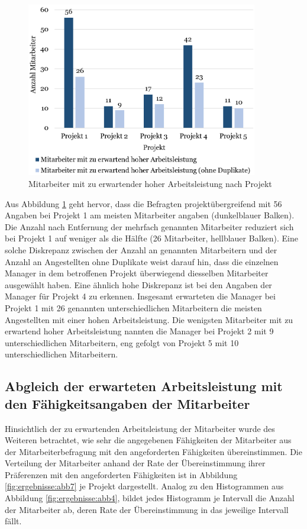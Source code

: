 \begin{figure}
    \centering
	\includegraphics[width=0.9\textwidth]{gfx/verteilung-m-prod.png}
	\caption[Mitarbeiter mit zu erwartender hoher Arbeitsleistung nach Projekt]{Mitarbeiter mit zu erwartender hoher Arbeitsleistung nach Projekt}
	\label{fig:ergebnisse:abb5}
\end{figure}

Aus Abbildung \ref{fig:ergebnisse:abb5} geht hervor, dass die Befragten projektübergreifend mit 56 Angaben bei Projekt 1 am meisten Mitarbeiter angaben (dunkelblauer Balken).
Die Anzahl nach Entfernung der mehrfach genannten Mitarbeiter reduziert sich bei Projekt 1 auf weniger als die Hälfte (26 Mitarbeiter, hellblauer Balken).
Eine solche Diskrepanz zwischen der Anzahl an genannten Mitarbeitern und der Anzahl an Angestellten ohne Duplikate weist darauf hin, dass die einzelnen Manager in dem betroffenen Projekt überwiegend diesselben Mitarbeiter ausgewählt haben.
Eine ähnlich hohe Diskrepanz ist bei den Angaben der Manager für Projekt 4 zu erkennen.
Insgesamt erwarteten die Manager bei Projekt 1 mit 26 genannten unterschiedlichen Mitarbeitern die meisten Angestellten mit einer hohen Arbeitsleistung.
Die wenigsten Mitarbeiter mit zu erwartend hoher Arbeitsleistung nannten die Manager bei Projekt 2 mit 9 unterschiedlichen Mitarbeitern, eng gefolgt von Projekt 5 mit 10 unterschiedlichen Mitarbeitern.

\subsection{Abgleich der erwarteten Arbeitsleistung mit den Fähigkeitsangaben der Mitarbeiter}
Hinsichtlich der zu erwartenden Arbeitsleistung der Mitarbeiter wurde des Weiteren betrachtet, wie sehr die angegebenen Fähigkeiten der Mitarbeiter aus der Mitarbeiterbefragung mit den angeforderten Fähigkeiten übereinstimmen.
Die Verteilung der Mitarbeiter anhand der Rate der Übereinstimmung ihrer Präferenzen mit den angeforderten Fähigkeiten ist in Abbildung \ref{fig:ergebnisse:abb7} je Projekt dargestellt.
Analog zu den Histogrammen aus Abbildung \ref{fig:ergebnisse:abb4}, bildet jedes Histogramm je Intervall die Anzahl der Mitarbeiter ab, deren Rate der Übereinstimmung in das jeweilige Intervall fällt.

